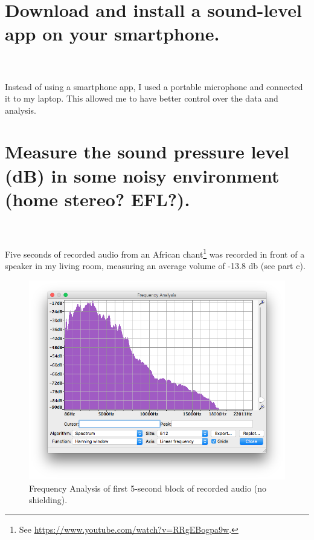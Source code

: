 \documentclass[onecolumn,10pt]{jhwhw}
\begin{document}
\part{Download and install a sound-level app on your smartphone.}
\\
\\
\noindent Instead of using a smartphone app, I used a portable microphone and connected it to my laptop. This allowed me to have better control over the data and analysis.

\part{Measure the sound pressure level (dB) in some noisy environment (home stereo? EFL?).}
\\
\\
\noindent Five seconds of recorded audio from an African chant\footnote{See \url{https://www.youtube.com/watch?v=RRgEBogpa9w}.} was recorded in front of a speaker in my living room, measuring an average volume of -13.8 db (see part c).
\begin{figure}[tbh!]
\begin{center}
\includegraphics[height=.3\textheight]{level1.png}
\end{center}
\caption{Frequency Analysis of first 5-second block of recorded audio (no shielding).}
\end{figure}
\end{document}
